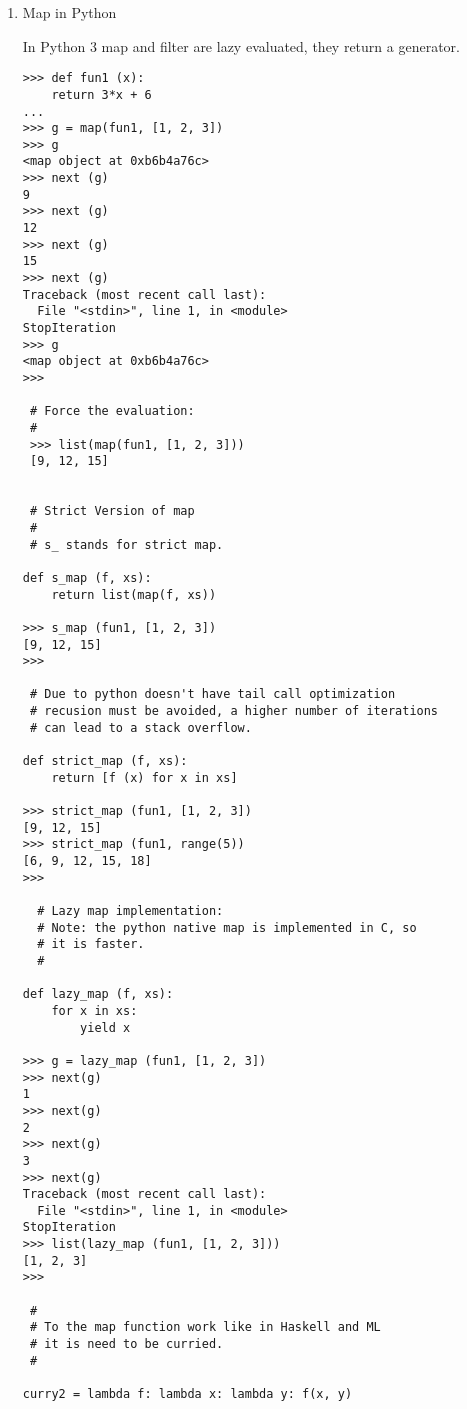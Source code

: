 \documentclass[11pt]{article}
\begin{document}
\begin{enumerate}
\begin{verbatim}
> let f x = 3 * x + 6
> :t f
f :: Num a => a -> a
> 


> map f [1, 2, 3]
[9,12,15]
> 

 -- Note: let is only needed in the REPL
 --
> let fs = map f

> :t fs
fs :: [Integer] -> [Integer]

> fs [1, 2, 3]
[9,12,15]
>
\end{verbatim}

\item Map in Python
\label{sec-1-9-2-0-3}

In Python 3 map and filter are lazy evaluated, they return a
generator. 

\begin{verbatim}
>>> def fun1 (x):
    return 3*x + 6
... 
>>> g = map(fun1, [1, 2, 3])
>>> g
<map object at 0xb6b4a76c>
>>> next (g)
9
>>> next (g)
12
>>> next (g)
15
>>> next (g)
Traceback (most recent call last):
  File "<stdin>", line 1, in <module>
StopIteration
>>> g
<map object at 0xb6b4a76c>
>>> 

 # Force the evaluation: 
 #
 >>> list(map(fun1, [1, 2, 3]))
 [9, 12, 15]


 # Strict Version of map
 # 
 # s_ stands for strict map.

def s_map (f, xs):
    return list(map(f, xs))
 
>>> s_map (fun1, [1, 2, 3])
[9, 12, 15]
>>> 

 # Due to python doesn't have tail call optimization
 # recusion must be avoided, a higher number of iterations
 # can lead to a stack overflow.
 
def strict_map (f, xs):
    return [f (x) for x in xs]
    
>>> strict_map (fun1, [1, 2, 3])
[9, 12, 15]
>>> strict_map (fun1, range(5))
[6, 9, 12, 15, 18]
>>> 

  # Lazy map implementation:
  # Note: the python native map is implemented in C, so
  # it is faster.
  #
  
def lazy_map (f, xs):
    for x in xs:
        yield x
        
>>> g = lazy_map (fun1, [1, 2, 3])
>>> next(g)
1
>>> next(g)
2
>>> next(g)
3
>>> next(g)
Traceback (most recent call last):
  File "<stdin>", line 1, in <module>
StopIteration
>>> list(lazy_map (fun1, [1, 2, 3]))
[1, 2, 3]
>>>           

 #
 # To the map function work like in Haskell and ML 
 # it is need to be curried.   
 #

curry2 = lambda f: lambda x: lambda y: f(x, y)


\end{verbatim}
\end{enumerate}
\end{document}
